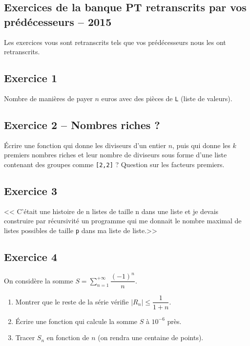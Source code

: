 \documentclass[10pt,fleqn]{article} %
\begin{document}
\begin{multicols}{2}
\section{Exercices de la banque PT retranscrits par vos prédécesseurs -- 2015}
\begin{rem}
Les exercices vous sont retranscrits tels que vos prédécesseurs nous les ont retranscrits. 
\end{rem}
\subsection*{Exercice 1}
Nombre de manières de payer $n$ euros avec des pièces de \texttt{L} (liste de valeurs).  

\subsection*{Exercice 2 -- Nombres riches ?}
Écrire une fonction qui donne les diviseurs d'un entier $n$, puis qui donne les $k$ premiers nombres riches et leur nombre de diviseurs sous forme d'une liste contenant des groupes comme \texttt{[2,2]} ? Question sur les facteurs premiers.

\subsection*{Exercice 3}
<< C'était une histoire de n listes de taille n dans une liste et je devais construire par récursivité un programme qui me donnait le nombre maximal de listes possibles de taille \texttt{p} dans ma liste de liste.>>


\subsection*{Exercice 4}
On considère la somme $S=\sum\limits_{n=1}^{+\infty} \dfrac{(-1)^n}{n}$.
\begin{enumerate}
\item Montrer que le reste de la série vérifie $\left| R_n \right| \leq \dfrac{1}{1+n}$.
\item Écrire une fonction qui calcule la somme $S$ à $10^{-6}$ près.
\item Tracer $S_n$ en fonction de $n$ (on rendra une centaine de points).
\end{enumerate}


\end{multicols}
\end{document}
